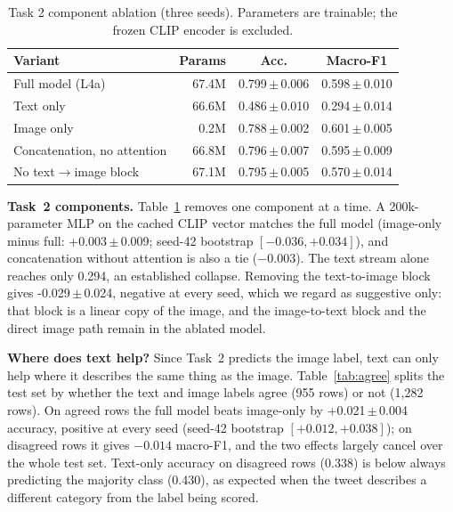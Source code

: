 \documentclass[conference]{IEEEtran}
\newcommand{\pmse}[2]{#1\,$\pm$\,#2}
\begin{document}
\begin{table}[t]
\centering
\caption{Task 2 component ablation (three seeds). Parameters are trainable; the frozen CLIP encoder is excluded.}
\label{tab:comp}
\footnotesize
\setlength{\tabcolsep}{3.5pt}
\begin{tabular}{lrcc}
\toprule
Variant & Params & Acc. & Macro-F1 \\
\midrule
Full model (L4a) & 67.4M & \pmse{0.799}{0.006} & \pmse{0.598}{0.010} \\
Text only & 66.6M & \pmse{0.486}{0.010} & \pmse{0.294}{0.014} \\
Image only & 0.2M & \pmse{0.788}{0.002} & \pmse{0.601}{0.005} \\
Concatenation, no attention & 66.8M & \pmse{0.796}{0.007} & \pmse{0.595}{0.009} \\
No text$\rightarrow$image block & 67.1M & \pmse{0.795}{0.005} & \pmse{0.570}{0.014} \\
\bottomrule
\end{tabular}
\end{table}

\textbf{Task~2 components.} Table~\ref{tab:comp} removes one component at a time. A 200k-parameter MLP on the cached CLIP vector matches the full model (image-only minus full: \pmse{+0.003}{0.009}; seed-42 bootstrap $[-0.036, +0.034]$), and concatenation without attention is also a tie ($-0.003$). The text stream alone reaches only 0.294, an established collapse. Removing the text-to-image block gives \pmse{-0.029}{0.024}, negative at every seed, which we regard as suggestive only: that block is a linear copy of the image, and the image-to-text block and the direct image path remain in the ablated model.

\textbf{Where does text help?} Since Task~2 predicts the image label, text can only help where it describes the same thing as the image. Table~\ref{tab:agree} splits the test set by whether the text and image labels agree (955 rows) or not (1,282 rows). On agreed rows the full model beats image-only by \pmse{+0.021}{0.004} accuracy, positive at every seed (seed-42 bootstrap $[+0.012, +0.038]$); on disagreed rows it gives $-0.014$ macro-F1, and the two effects largely cancel over the whole test set. Text-only accuracy on disagreed rows (0.338) is below always predicting the majority class (0.430), as expected when the tweet describes a different category from the label being scored.
\end{document}
